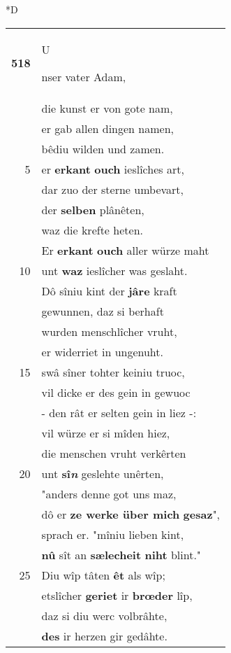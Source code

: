 \documentclass[8pt,a4paper,notitlepage]{article}
\begin{document}
\begin{table}[ht]
\begin{minipage}[t]{0.5\linewidth}
\small
\begin{center}*D
\end{center}
\begin{tabular}{rl}
\textbf{518} & \begin{large}U\end{large}nser vater Adam,\\ 
 & die kunst er von gote nam,\\ 
 & er gab allen dingen namen,\\ 
 & bêdiu wilden und zamen.\\ 
5 & er \textbf{erkant} \textbf{ouch} ieslîches art,\\ 
 & dar zuo der sterne umbevart,\\ 
 & der \textbf{selben} plânêten,\\ 
 & waz die krefte heten.\\ 
 & Er \textbf{erkant} \textbf{ouch} aller würze maht\\ 
10 & unt \textbf{waz} ieslîcher was geslaht.\\ 
 & Dô sîniu kint der \textbf{jâre} kraft\\ 
 & gewunnen, daz si berhaft\\ 
 & wurden menschlîcher vruht,\\ 
 & er widerriet in ungenuht.\\ 
15 & swâ sîner tohter keiniu truoc,\\ 
 & vil dicke er des gein in gewuoc\\ 
 & - den rât er selten gein in liez -:\\ 
 & vil würze er si mîden hiez,\\ 
 & die menschen vruht verkêrten\\ 
20 & unt \textbf{sî\textit{n}} geslehte unêrten,\\ 
 & "anders denne got uns maz,\\ 
 & dô er \textbf{ze werke über mich} \textbf{gesaz}",\\ 
 & sprach er. "mîniu lieben kint,\\ 
 & \textbf{nû} sît an \textbf{sælecheit} \textbf{niht} blint."\\ 
25 & Diu wîp tâten \textbf{êt} als wîp;\\ 
 & etslîcher \textbf{geriet} ir \textbf{brœder} lîp,\\ 
 & daz si diu werc volbrâhte,\\ 
 & \textbf{des} ir herzen gir gedâhte.\\ 

\end{tabular}
\end{minipage}
\end{table}
\end{document}
